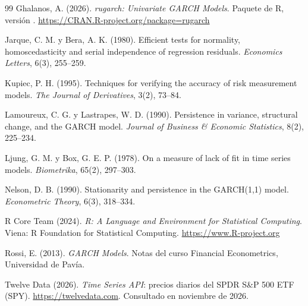 \documentclass[legalpaper,11pt]{article}
\begin{document}
\begin{thebibliography}{99}
Ghalanos, A. (2026). \emph{rugarch: Univariate GARCH Models}. Paquete de R, versión \gRugarch.
\url{https://CRAN.R-project.org/package=rugarch}

Jarque, C. M. y Bera, A. K. (1980). Efficient tests for normality, homoscedasticity and serial
independence of regression residuals. \emph{Economics Letters}, 6(3), 255--259.

Kupiec, P. H. (1995). Techniques for verifying the accuracy of risk measurement models.
\emph{The Journal of Derivatives}, 3(2), 73--84.

Lamoureux, C. G. y Lastrapes, W. D. (1990). Persistence in variance, structural change, and
the GARCH model. \emph{Journal of Business \& Economic Statistics}, 8(2), 225--234.

Ljung, G. M. y Box, G. E. P. (1978). On a measure of lack of fit in time series models.
\emph{Biometrika}, 65(2), 297--303.

Nelson, D. B. (1990). Stationarity and persistence in the GARCH(1,1) model.
\emph{Econometric Theory}, 6(3), 318--334.

R Core Team (2024). \emph{R: A Language and Environment for Statistical Computing}. Viena:
R Foundation for Statistical Computing. \url{https://www.R-project.org}

Rossi, E. (2013). \emph{GARCH Models}. Notas del curso Financial Econometrics, Universidad de
Pavía.

Twelve Data (2026). \emph{Time Series API}: precios diarios del SPDR S\&P 500 ETF (SPY).
\url{https://twelvedata.com}. Consultado en noviembre de 2026.

\end{thebibliography}
\end{document}
